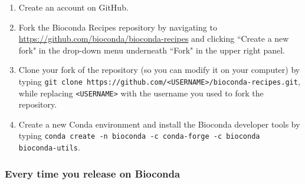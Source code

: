 \documentclass[main.tex]{subfiles}
\begin{document}
\begin{enumerate}
    \item Create an account on GitHub.
    \item Fork the Bioconda Recipes repository by navigating to \url{https://github.com/bioconda/bioconda-recipes} and clicking ``Create a new fork" in the drop-down menu underneath ``Fork" in the upper right panel.
    \item Clone your fork of the repository (so you can modify it on your computer) by typing \verb|git clone https://github.com/<USERNAME>/bioconda-recipes.git|, while replacing \verb|<USERNAME>| with the username you used to fork the repository.
    \item Create a new Conda environment and install the Bioconda developer tools by typing \verb|conda create -n bioconda -c conda-forge -c bioconda bioconda-utils|.
\end{enumerate}


\subsubsection{Every time you release on Bioconda}
\end{document}
